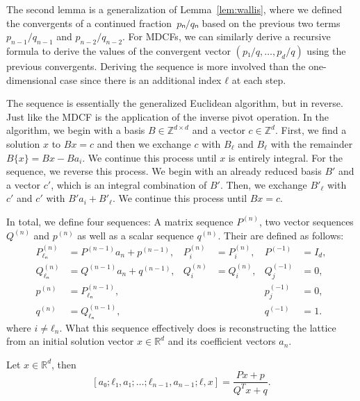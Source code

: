 The second lemma is a generalization of Lemma~\vref{lem:wallis},
where we defined the convergents of a continued fraction~$pₙ/qₙ$
based on the previous two terms~$p_{n-1}/q_{n-1}$ and $p_{n-2}/q_{n-2}$.
For MDCFs, we can similarly derive a recursive formula to derive the values of
the convergent vector $(p₁/q, \dots, p_d/q)$ using the previous convergents.
Deriving the sequence is more involved than the one-dimensional case since
there is an additional index $ℓ$ at each step.

The sequence is essentially the generalized Euclidean algorithm, but in reverse.
Just like the MDCF is the application of the inverse pivot operation.
In the algorithm, we begin with a basis $B ∈ ℤ^{d×d}$ and a vector $c ∈ ℤ^d$.
First, we find a solution $x$ to $Bx = c$ and then we exchange $c$ with $B_ℓ$
and $B_ℓ$ with the remainder $B\{x\} = Bx - Ba_i$.
We continue this process until $x$ is entirely integral.
For the sequence, we reverse this process.
We begin with an already reduced basis $B'$ and a vector $c'$, which is an
integral combination of $B'$.
Then, we exchange $B'_{ℓ}$ with $c'$ and $c'$ with $B' a_i + B'_{ℓ}$.
We continue this process until $B x = c$.

In total, we define four sequences:
A matrix sequence $P^{(n)}$, two vector sequences $Q^{(n)}$ and $p^{(n)}$ as well as a scalar sequence $q^{(n)}$.
Their are defined as follows:
\begin{align*}
  P_{ℓₙ}^{(n)} & = P^{(n-1)} a_n + p^{(n-1)}, & P_i^{(n)} & = P_i^{(n)}, & P^{(-1)}   & = I_d, \\
  Q_{ℓₙ}^{(n)} & = Q^{(n-1)} a_n + q^{(n-1)}, & Q_i^{(n)} & = Q_i^{(n)}, & Q^{(-1)}_j & = 0,   \\
  p^{(n)}      & = P_{ℓₙ}^{(n-1)},            &           &              & p^{(-1)}_j & = 0,   \\
  q^{(n)}      & = Q_{ℓₙ}^{(n-1)},            &           &              & q^{(-1)}   & = 1.
\end{align*}
where $i ≠ ℓ_n$.
What this sequence effectively does is reconstructing the lattice from an
initial solution vector $x ∈ ℝ^d$ and its coefficient vectors $a_n$.

\begin{lemma}[Wallis]
  \label{lem:mdcf-wallis}
  Let $x ∈ ℝ^d$, then
  \[
    [a₀; ℓ₁, a₁; …; ℓ_{n-1}, a_{n-1}; ℓ, x]
    = \frac{P x + p}{Q^T x + q}.
  \]
\end{lemma}

